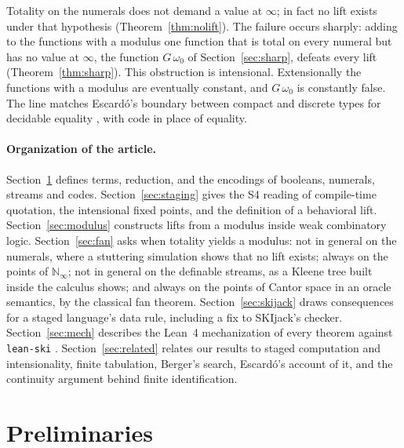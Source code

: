 \documentclass[acmsmall,review,screen]{acmart}\def\acmclass{}
\theoremstyle{plain}
\theoremstyle{definition}
\theoremstyle{remark}
\begin{document}
Totality on the numerals does not demand a value at $\infty$; in fact no lift exists
under that hypothesis (Theorem~\ref{thm:nolift}).  The failure occurs sharply:
adding to the functions with a modulus one function that is total on every numeral
but has no value at $\infty$, the function $G\,\omega_0$ of Section~\ref{sec:sharp},
defeats every lift (Theorem~\ref{thm:sharp}).  This obstruction
is intensional.  Extensionally the functions with a modulus are eventually constant,
and $G\,\omega_0$ is constantly false.
The line matches Escard\'o's boundary between compact and discrete types for
decidable equality \citep[Thm.~4.13]{Escardo2008}, with code in place of equality.  %

\paragraph{Organization of the article.}  Section~\ref{sec:prelim} defines terms,
reduction, and the encodings of booleans, numerals, streams and codes.
Section~\ref{sec:staging} gives the S4 reading of compile-time quotation, the
intensional fixed points, and the definition of a behavioral lift.
Section~\ref{sec:modulus} constructs lifts from a modulus inside weak combinatory
logic.  Section~\ref{sec:fan} asks when totality yields a modulus: not in general on the
numerals, where a stuttering simulation shows that no lift exists; always on the points
of $\mathbb{N}_\infty$; not in general on the definable streams, as a Kleene tree built
inside the calculus shows; and always on the points of Cantor space in an oracle
semantics, by the classical fan theorem.  Section~\ref{sec:skijack} draws consequences
for a staged language's data rule, including a fix to SKIjack's checker.
Section~\ref{sec:mech} describes the Lean~4 mechanization of every theorem against
\texttt{lean-ski} \citep{leanski}.  Section~\ref{sec:related} relates our results to
staged computation and intensionality, finite tabulation, Berger's search, Escard\'o's
account of it, and the continuity argument behind finite identification.

\section{Preliminaries}\label{sec:prelim}
\end{document}
